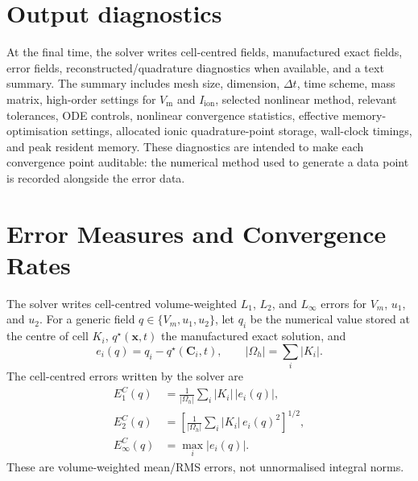 \documentclass[11pt,a4paper]{article}
\newcommand{\Vm}{V_{\text{m}}}
\newcommand{\Iion}{I_{\mathrm{ion}}}
\begin{document}
\section{Output diagnostics}

At the final time, the solver writes cell-centred fields, manufactured exact
fields, error fields, reconstructed/quadrature diagnostics when available, and
a text summary. The summary includes mesh size, dimension, $\Delta t$, time
scheme, mass matrix, high-order settings for $\Vm$ and $\Iion$, selected
nonlinear method, relevant tolerances, ODE controls, nonlinear convergence
statistics, effective memory-optimisation settings, allocated ionic
quadrature-point storage, wall-clock timings, and peak resident memory. These diagnostics are
intended to make each convergence point auditable: the numerical method used to
generate a data point is recorded alongside the error data.

\section{Error Measures and Convergence Rates}
The solver writes cell-centred volume-weighted $L_1$, $L_2$, and $L_\infty$
errors for $V_m$, $u_1$, and $u_2$. For a generic field $q\in\{V_m,u_1,u_2\}$,
let $q_i$ be the numerical value stored at the centre of cell $K_i$,
$q^\star(\mathbf{x},t)$ the manufactured exact solution, and
\begin{equation}
  e_i(q)=q_i-q^\star(\mathbf{C}_i,t),
  \qquad
  |\Omega_h|=\sum_i |K_i|.
\end{equation}
The cell-centred errors written by the solver are
\begin{align}
  E_{1}^{C}(q)
  &=
  \frac{1}{|\Omega_h|}
  \sum_i |K_i|\,|e_i(q)|,
  \label{eq:cell-l1-error}
  \\
  E_{2}^{C}(q)
  &=
  \left[
  \frac{1}{|\Omega_h|}
  \sum_i |K_i|\,e_i(q)^2
  \right]^{1/2},
  \label{eq:cell-l2-error}
  \\
  E_{\infty}^{C}(q)
  &=
  \max_i |e_i(q)|.
  \label{eq:cell-linf-error}
\end{align}
These are volume-weighted mean/RMS errors, not unnormalised integral norms.
\end{document}
